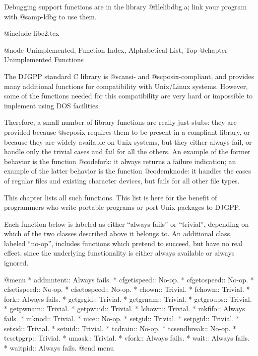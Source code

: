 Debugging support functions are in the library @file{libdbg.a}; link
your program with @samp{-ldbg} to use them.

@include libc2.tex

@node Unimplemented, Function Index, Alphabetical List, Top
@chapter Unimplemented Functions

The DJGPP standard C library is @sc{ansi}- and @sc{posix}-compliant, and
provides many additional functions for compatibility with Unix/Linux
systems.  However, some of the functions needed for this compatibility
are very hard or impossible to implement using DOS facilities.

Therefore, a small number of library functions are really just stubs:
they are provided because @sc{posix} requires them to be present in a
compliant library, or because they are widely available on Unix systems,
but they either always fail, or handle only the trivial cases and fail
for all the others.  An example of the former behavior is the function
@code{fork}: it always returns a failure indication; an example of the
latter behavior is the function @code{mknode}: it handles the cases of
regular files and existing character devices, but fails for all other
file types.

This chapter lists all such functions.  This list is here for the
benefit of programmers who write portable programs or port Unix packages
to DJGPP.

Each function below is labeled as either ``always fails'' or
``trivial'', depending on which of the two classes described above it
belongs to.  An additional class, labeled ``no-op'', includes functions
which pretend to succeed, but have no real effect, since the underlying
functionality is either always available or always ignored.

@menu
* addmntent::                Always fails.
* cfgetispeed::              No-op.
* cfgetospeed::              No-op.
* cfsetispeed::              No-op.
* cfsetospeed::              No-op.
* chown::                    Trivial.
* fchown::                   Trivial.
* fork::                     Always fails.
* getgrgid::                 Trivial.
* getgrnam::                 Trivial.
* getgroups::                Trivial.
* getpwnam::                 Trivial.
* getpwuid::                 Trivial.
* lchown::                   Trivial.
* mkfifo::                   Always fails.
* mknod::                    Trivial.
* nice::                     No-op.
* setgid::                   Trivial.
* setpgid::                  Trivial.
* setsid::                   Trivial.
* setuid::                   Trivial.
* tcdrain::                  No-op.
* tcsendbreak::              No-op.
* tcsetpgrp::                Trivial.
* umask::                    Trivial.
* vfork::                    Always fails.
* wait::                     Always fails.
* waitpid::                  Always fails.
@end menu

